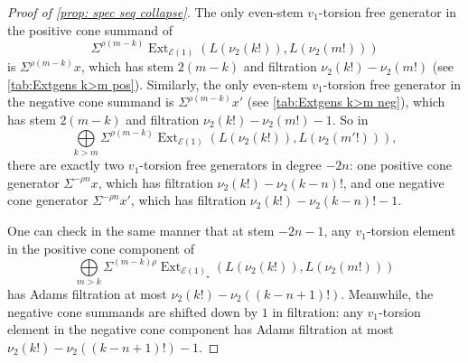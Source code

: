 \documentclass[10pt,a4paper]{amsart}
\DeclareMathOperator{\Ext}{Ext}
\newcommand{\cE}{{\mathcal E}}
\begin{document}
\begin{proof}[Proof of \cref{prop: spec seq collapse}]
The only even-stem $v_1$-torsion free generator in the positive cone summand of 
\[
\Sigma^{\rho(m-k)}\Ext_{\cE(1)}( L(\nu_{2}(k!) ), L(\nu_{2}(m!) ) )
\]
is $\Sigma^{\rho(m - k)} x$, which has stem $2(m-k)$ and filtration $\nu_{2}(k!) - \nu_{2}(m!)$ (see \cref{tab:Extgens k>m pos}). Similarly, the only even-stem $v_1$-torsion free generator in the negative cone summand is $\Sigma^{\rho(m - k)} x'$ (see \cref{tab:Extgens k>m neg}), which has stem $2(m-k)$ and filtration $\nu_{2}(k!) - \nu_{2}(m!) - 1$. So in \[
\bigoplus\limits_{k > m}\Sigma^{\rho(m-k)}\Ext_{\cE(1)}( L(\nu_{2}(k!) ), L(\nu_{2}(m'!) ) ),\]
there are exactly two $v_{1}$-torsion free generators in degree $-2n$: one positive cone generator $\Sigma^{-\rho n}x$, which has filtration $\nu_{2}(k!) - \nu_{2}(k-n)!$, and one negative cone generator $\Sigma^{-\rho n}x'$, which has filtration $\nu_{2}(k!) - \nu_{2}(k-n)!-1$.

One can check in the same manner that at stem $-2n-1$, any $v_{1}$-torsion element in the positive cone component of 
\[
\bigoplus\limits_{m>k}\Sigma^{(m-k)\rho}\Ext_{\cE(1)_{\star}}\left(L(\nu_{2}(k!)), L(\nu_{2}(m!)) \right)
\]
has Adams filtration at most $\nu_{2}(k!) - \nu_{2}\left((k-n+1)! \right)$. Meanwhile, the negative cone summands are shifted down by $1$ in filtration: any $v_{1}$-torsion element in the negative cone component has Adams filtration at most $\nu_{2}(k!) - \nu_{2}\left((k-n+1)! \right)-1$. 

\end{proof}
\end{document}
